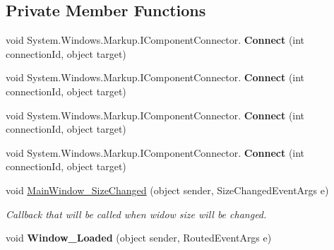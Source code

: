 \subsection*{Private Member Functions}
\begin{DoxyCompactItemize}
\item 
\mbox{\label{class_teacher_handbook_1_1_u_i_1_1_windows_1_1_main_window_a2cf222703bc19ba205642fcfcde4b6f9}} 
void System.\+Windows.\+Markup.\+I\+Component\+Connector. {\bfseries Connect} (int connection\+Id, object target)
\item 
\mbox{\label{class_teacher_handbook_1_1_u_i_1_1_windows_1_1_main_window_a2cf222703bc19ba205642fcfcde4b6f9}} 
void System.\+Windows.\+Markup.\+I\+Component\+Connector. {\bfseries Connect} (int connection\+Id, object target)
\item 
\mbox{\label{class_teacher_handbook_1_1_u_i_1_1_windows_1_1_main_window_a2cf222703bc19ba205642fcfcde4b6f9}} 
void System.\+Windows.\+Markup.\+I\+Component\+Connector. {\bfseries Connect} (int connection\+Id, object target)
\item 
\mbox{\label{class_teacher_handbook_1_1_u_i_1_1_windows_1_1_main_window_a2cf222703bc19ba205642fcfcde4b6f9}} 
void System.\+Windows.\+Markup.\+I\+Component\+Connector. {\bfseries Connect} (int connection\+Id, object target)
\item 
void \mbox{\hyperlink{class_teacher_handbook_1_1_u_i_1_1_windows_1_1_main_window_ab6ef44632d6cc2566f9c498c658528b3}{Main\+Window\+\_\+\+Size\+Changed}} (object sender, Size\+Changed\+Event\+Args e)
\begin{DoxyCompactList}\small\item\em Callback that will be called when widow size will be changed. \end{DoxyCompactList}\item 
\mbox{\label{class_teacher_handbook_1_1_u_i_1_1_windows_1_1_main_window_a22afd69c54f5874e5fa59e856302f2e1}} 
void {\bfseries Window\+\_\+\+Loaded} (object sender, Routed\+Event\+Args e)
\end{DoxyCompactItemize}
